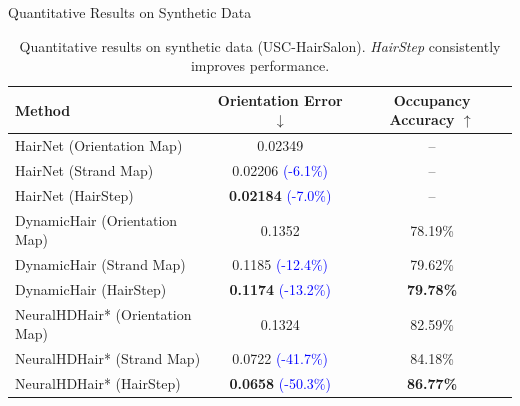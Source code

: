 \begin{frame}[t]{Quantitative Results on Synthetic Data}
    \begin{table}[h]
        \centering
        \small
        \renewcommand{\arraystretch}{1.4}
        \begin{tabular}{l|c|c}
            \hline
            \rowcolor{myLightBlue}
            Method & Orientation Error $\downarrow$ & Occupancy Accuracy $\uparrow$ \\
            \hline
            HairNet (Orientation Map) & 0.02349 & -- \\
            HairNet (Strand Map) & 0.02206 \textcolor{blue}{(-6.1\%)} & -- \\
            HairNet (HairStep) & \textbf{0.02184} \textcolor{blue}{(-7.0\%)} & -- \\
            \hline
            DynamicHair (Orientation Map) & 0.1352 & 78.19\% \\
            DynamicHair (Strand Map) & 0.1185 \textcolor{blue}{(-12.4\%)} & 79.62\% \\
            DynamicHair (HairStep) & \textbf{0.1174} \textcolor{blue}{(-13.2\%)} & \textbf{79.78\%} \\
            \hline
            NeuralHDHair* (Orientation Map) & 0.1324 & 82.59\% \\
            NeuralHDHair* (Strand Map) & 0.0722 \textcolor{blue}{(-41.7\%)} & 84.18\% \\
            NeuralHDHair* (HairStep) & \textbf{0.0658} \textcolor{blue}{(-50.3\%)} & \textbf{86.77\%} \\
            \hline
        \end{tabular}
        \caption{Quantitative results on synthetic data (USC-HairSalon). \emph{HairStep} consistently improves performance.}
        \label{tab:representation_effectiveness_synthetic}
    \end{table}
\end{frame}

